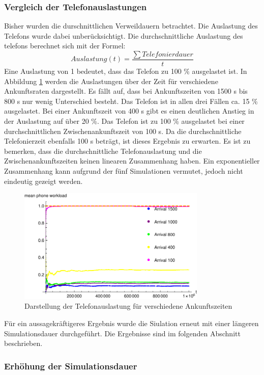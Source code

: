\subsubsection{Vergleich der Telefonauslastungen}
Bisher wurden die durschnittlichen Verweildauern betrachtet. Die Auslastung des Telefons wurde dabei unberücksichtigt. Die durchschnittliche Auslastung des telefons berechnet sich mit der Formel:
$$
Auslastung(t) = \frac{\sum Telefonierdauer}{t}
$$
Eine Auslastung von 1 bedeutet, dass das Telefon zu 100 \% ausgelastet ist. In Abbildung \ref{fig:1_Phone_Workload_Vergleich} werden die Auslastungen über der Zeit für verschiedene Ankunftsraten dargestellt. Es fällt auf, dass bei Ankunftszeiten von 1500 s bis 800 s nur wenig Unterschied besteht. Das Telefon ist in allen drei Fällen ca. 15 \% ausgelastet. Bei einer Ankunftszeit von 400 s gibt es einen deutlichen Anstieg in der Auslastung auf über 20 \%. Das Telefon ist zu 100 \% ausgelastet bei einer durchschnittlichen Zwischenankunftszeit von 100 s. Da die durchschnittliche Telefonierzeit ebenfalls 100 s beträgt, ist dieses Ergebnis zu erwarten. Es ist zu bemerken, dass die durchschnittliche Telefonauslastung und die Zwischenankunftszeiten keinen linearen Zusammenhang haben. Ein exponentieller Zusammenhang kann aufgrund der fünf Simulationen vermutet, jedoch nicht eindeutig gezeigt werden.
\begin{figure}[htpb]
	\centering
	\includegraphics[width=0.8\textwidth]{abbildungen/1_Phone/Auslastung_Vegleich/MeanPhoneWorkload.pdf}
	\caption{Darstellung der Telefonauslastung für verschiedene Ankunftszeiten}
	\label{fig:1_Phone_Workload_Vergleich}
\end{figure}

Für ein aussagekräftigeres Ergebnis wurde die Siulation erneut mit einer längeren Simulationsdauer durchgeführt. Die Ergebnisse sind im folgenden Abschnitt beschrieben.

\subsubsection{Erhöhung der Simulationsdauer}

